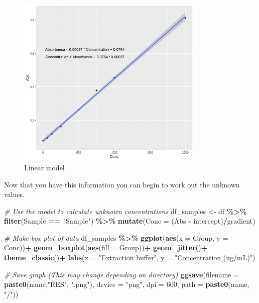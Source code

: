 \documentclass[
]{article}
\newenvironment{Shaded}{\begin{snugshade}}{\end{snugshade}}
\newcommand{\AttributeTok}[1]{\textcolor[rgb]{0.13,0.29,0.53}{#1}}
\newcommand{\CommentTok}[1]{\textcolor[rgb]{0.56,0.35,0.01}{\textit{#1}}}
\newcommand{\DecValTok}[1]{\textcolor[rgb]{0.00,0.00,0.81}{#1}}
\newcommand{\FunctionTok}[1]{\textcolor[rgb]{0.13,0.29,0.53}{\textbf{#1}}}
\newcommand{\NormalTok}[1]{#1}
\newcommand{\OtherTok}[1]{\textcolor[rgb]{0.56,0.35,0.01}{#1}}
\newcommand{\SpecialCharTok}[1]{\textcolor[rgb]{0.81,0.36,0.00}{\textbf{#1}}}
\newcommand{\StringTok}[1]{\textcolor[rgb]{0.31,0.60,0.02}{#1}}
\begin{document}
\begin{figure}
\centering
\includegraphics[width=0.8\textwidth,height=\textheight]{../Images/tendon_extraction_testLOBF.png}
\caption{Linear model}
\end{figure}

\pagebreak

Now that you have this information you can begin to work out the unknown
values.

\begin{Shaded}
\begin{Highlighting}[]

\CommentTok{\# Use the model to calculate unknown concentrations}
\NormalTok{df\_samples }\OtherTok{\textless{}{-}}\NormalTok{ df }\SpecialCharTok{\%\textgreater{}\%} 
  \FunctionTok{filter}\NormalTok{(Sample }\SpecialCharTok{==} \StringTok{"Sample"}\NormalTok{) }\SpecialCharTok{\%\textgreater{}\%} 
  \FunctionTok{mutate}\NormalTok{(}\AttributeTok{Conc =}\NormalTok{ (Abs }\SpecialCharTok{{-}}\NormalTok{ intercept)}\SpecialCharTok{/}\NormalTok{gradient)}

\CommentTok{\# Make box plot of data}
\NormalTok{df\_samples }\SpecialCharTok{\%\textgreater{}\%} 
  \FunctionTok{ggplot}\NormalTok{(}\FunctionTok{aes}\NormalTok{(}\AttributeTok{x =}\NormalTok{ Group, }\AttributeTok{y =}\NormalTok{ Conc))}\SpecialCharTok{+}
  \FunctionTok{geom\_boxplot}\NormalTok{(}\FunctionTok{aes}\NormalTok{(}\AttributeTok{fill =}\NormalTok{ Group))}\SpecialCharTok{+}
  \FunctionTok{geom\_jitter}\NormalTok{()}\SpecialCharTok{+}
  \FunctionTok{theme\_classic}\NormalTok{()}\SpecialCharTok{+}
  \FunctionTok{labs}\NormalTok{(}\AttributeTok{x =} \StringTok{"Extraction buffer"}\NormalTok{, }\AttributeTok{y =} \StringTok{"Concentration (ug/mL)"}\NormalTok{)}


\CommentTok{\# Save graph (This may change depending on directory)}
\FunctionTok{ggsave}\NormalTok{(}\AttributeTok{filename =} \FunctionTok{paste0}\NormalTok{(name,}\StringTok{"RES"}\NormalTok{, }\StringTok{".png"}\NormalTok{),}
       \AttributeTok{device =} \StringTok{"png"}\NormalTok{,}
       \AttributeTok{dpi =} \DecValTok{600}\NormalTok{,}
       \AttributeTok{path =} \FunctionTok{paste0}\NormalTok{(name, }\StringTok{"/"}\NormalTok{))}
\end{Highlighting}
\end{Shaded}
\end{document}

